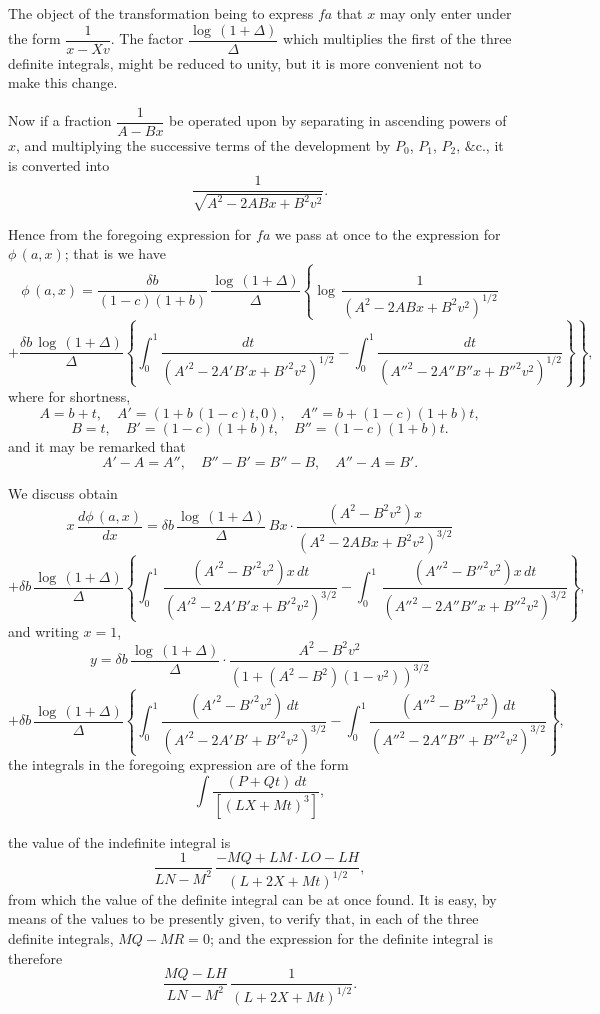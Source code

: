 \documentclass[11pt,a4paper]{book}
\begin{document}
\setcounter{page}{102}

The object of the transformation being to express $fa$ that $x$ may only enter under the form $\dfrac{1}{x-Xv}$. The factor $\dfrac{\log\,(1+\Delta)}{\Delta}$ which multiplies the first of the three definite integrals, might be reduced to unity, but it is more convenient not to make this change.

Now if a fraction $\dfrac{1}{A-Bx}$ be operated upon by separating in ascending powers of $x$, and multiplying the successive terms of the development by $P_0$, $P_1$, $P_2$, $\&$c., it is converted into
\[
\frac{1}{\sqrt{A^2 - 2ABx + B^2v^2}}.
\]

Hence from the foregoing expression for $fa$ we pass at once to the expression for $\phi\,(a,x)$; that is we have
\[
\phi\,(a,x) = \frac{\delta b}{(1-c)(1+b)}\,\frac{\log\,(1+\Delta)}{\Delta}\left\{\log\,\frac{1}{(A^2 - 2ABx + B^2v^2)^{1/2}}\right.
\]
\[
\left.+\frac{\delta b\,\log\,(1+\Delta)}{\Delta}\left\{\int_{0}^{1}\frac{dt}{(A'^2-2A'B'x+B'^2v^2)^{1/2}}-\int_{0}^{1}\frac{dt}{(A''^2-2A''B''x+B''^2v^2)^{1/2}}\right\}\right\},
\]
where for shortness,
\[
A = b+t,\quad A' = (1+b\,(1-c)t,0),\quad A''=b+(1-c)(1+b)t,
\]
\[
B = t,\quad B' = (1-c)(1+b)t,\quad B''=(1-c)(1+b)t.
\]
and it may be remarked that
\[
A'-A=A'',\quad B''-B'=B''-B,\quad A''-A=B'.
\]

We discuss obtain
\[
x\,\frac{d\phi\,(a,x)}{dx} = \delta b\,\frac{\log\,(1+\Delta)}{\Delta}\,Bx \cdot \frac{(A^2 - B^2v^2)x}{(A^2 - 2ABx + B^2v^2)^{3/2}}
\]
\[
+\delta b\,\frac{\log\,(1+\Delta)}{\Delta}\left\{\int_{0}^{1}\,\frac{(A'^2-B'^2v^2)x\,dt}{(A'^2-2A'B'x+B'^2v^2)^{3/2}} - \int_{0}^{1}\,\frac{(A''^2-B''^2v^2)x\,dt}{(A''^2-2A''B''x+B''^2v^2)^{3/2}}\right\},
\]
and writing $x=1$,
\[
y = \delta b\,\frac{\log\,(1+\Delta)}{\Delta}\cdot\frac{A^2 - B^2v^2}{(1+(A^2-B^2)(1-v^2))^{3/2}}
\]
\[
+ \delta b\,\frac{\log\,(1+\Delta)}{\Delta}\left\{\int_{0}^{1}\frac{(A'^2-B'^2v^2)\,dt}{(A'^2-2A'B'+B'^2v^2)^{3/2}} - \int_{0}^{1}\frac{(A''^2-B''^2v^2)\,dt}{(A''^2-2A''B''+B''^2v^2)^{3/2}}\right\},
\]
the integrals in the foregoing expression are of the form
\[
\int\frac{(P+Qt)\,dt}{[(LX+Mt)^{3}]},
\]

\setcounter{page}{103}

the value of the indefinite integral is
\[
\frac{1}{LN-M^2}\,\frac{-MQ + LM\cdot LO - LH}{(L+2X+Mt)^{1/2}},
\]
from which the value of the definite integral can be at once found. It is easy, by means of the values to be presently given, to verify that, in each of the three definite integrals, $MQ - MR = 0$; and the expression for the definite integral is therefore
\[
\frac{MQ - LH}{LN - M^2}\,\frac{1}{(L+2X+Mt)^{1/2}}.
\]
\end{document}
